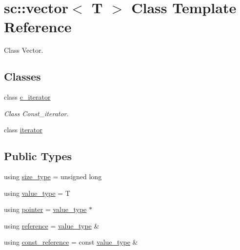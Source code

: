 \hypertarget{classsc_1_1vector}{}\section{sc\+:\+:vector$<$ T $>$ Class Template Reference}
\label{classsc_1_1vector}


Class Vector.  


\subsection*{Classes}
\begin{DoxyCompactItemize}
\item 
class \hyperlink{classsc_1_1vector_1_1c__iterator}{c\+\_\+iterator}
\begin{DoxyCompactList}\small\item\em Class Const\+\_\+iterator. \end{DoxyCompactList}\item 
class \hyperlink{classsc_1_1vector_1_1iterator}{iterator}
\end{DoxyCompactItemize}
\subsection*{Public Types}
\begin{DoxyCompactItemize}
\item 
using \hyperlink{classsc_1_1vector_a48bf37ba1a6d0c13504414d86e27c399}{size\+\_\+type} = unsigned long
\item 
using \hyperlink{classsc_1_1vector_ad37f5bfa688e43c420ed565e4bff6fac}{value\+\_\+type} = T
\item 
using \hyperlink{classsc_1_1vector_a482b9f7edc29ff22ccd2b17a23e37eb4}{pointer} = \hyperlink{classsc_1_1vector_ad37f5bfa688e43c420ed565e4bff6fac}{value\+\_\+type} $\ast$
\item 
using \hyperlink{classsc_1_1vector_a3a0cf48945f82afc95f92710883016d2}{reference} = \hyperlink{classsc_1_1vector_ad37f5bfa688e43c420ed565e4bff6fac}{value\+\_\+type} \&
\item 
using \hyperlink{classsc_1_1vector_af35df3788a0e228d679e7520b2485896}{const\+\_\+reference} = const \hyperlink{classsc_1_1vector_ad37f5bfa688e43c420ed565e4bff6fac}{value\+\_\+type} \&
\end{DoxyCompactItemize}
